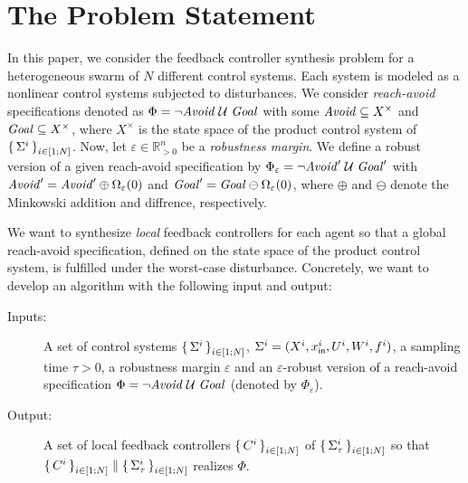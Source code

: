 
\section{The Problem Statement}
\label{sec:problem}
In this paper, we consider the feedback controller synthesis problem for a heterogeneous swarm of $N$ different control systems.
Each system is modeled as a nonlinear control systems subjected to disturbances. We consider \emph{reach-avoid} specifications denoted as $\Phi=\lnot\mathit{Avoid}\;\mathcal{U}\;\mathit{Goal}$ with some $\mathit{Avoid}\subseteq X^\times$ and $\mathit{Goal}\subseteq X^\times$, where $X^\times$ is the state space of the product control system of $\set{\Sigma^i}_{i\in [1;N]}$. Now, let $\varepsilon\in \mathbb{R}^n_{>0}$ be a \emph{robustness margin}. We define a robust version of a given reach-avoid specification by $\Phi_\varepsilon=\lnot\mathit{Avoid}'\;\mathcal{U}\;\mathit{Goal}'$ with $\mathit{Avoid}'=\mathit{Avoid}'\oplus\Omega_\varepsilon(0)$ and $\mathit{Goal}'=\mathit{Goal}\ominus\Omega_\varepsilon(0)$, where $\oplus$ and $\ominus$ denote the Minkowski addition and diffrence, respectively. %

We want to synthesize \emph{local} feedback controllers for each agent so that a global reach-avoid specification, defined on the state space of the product control system, is fulfilled under the worst-case disturbance.
Concretely, we want to develop an algorithm with the following input and output:
\begin{description}
	\item[Inputs:] A set of control systems $\set{\Sigma^i}_{i\in [1;N]}$, $\Sigma^i=(X^i,x_{\mathsf{in}}^i,U^i,W^i,f^i)$, a sampling time $\tau >0$, a robustness margin $\varepsilon$ and an $\varepsilon$-robust version of a reach-avoid specification $\Phi=\lnot\mathit{Avoid}\;\mathcal{U}\;\mathit{Goal}$ (denoted by $\Phi_\varepsilon$).%
	\item[Output:] A set of local feedback controllers $\set{C^i}_{i\in [1;N]}$ of $\set{\Sigma^i_\tau}_{i\in [1;N]}$ so that $\set{C^i}_{i\in [1;N]}\parallel \set{\Sigma_\tau^i}_{i\in [1;N]}$ realizes $\Phi$. 
\end{description}

